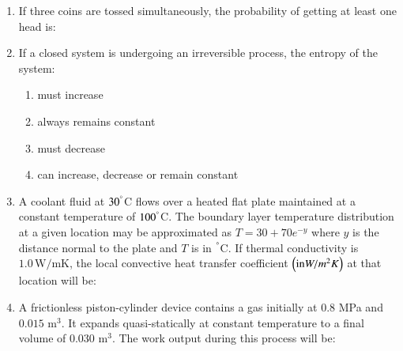 \documentclass[journal]{IEEEtran}
\begin{document}
\begin{enumerate}[leftmargin=0pt]
\item If three coins are tossed simultaneously, the probability of getting at least one head is:
  \begin{enumerate}
  \end{enumerate}
  \hfill{}


\item If a closed system is undergoing an irreversible process, the entropy of the system:
  \begin{enumerate}
    \item must increase
    \item always remains constant
    \item must decrease
    \item can increase, decrease or remain constant
  \end{enumerate}
  \hfill{}

\item A coolant fluid at $30^\degree$C flows over a heated flat plate maintained at a constant temperature of $100^\degree$C. The boundary layer temperature distribution at a given location may be approximated as $T = 30 + 70 e^{-y}$ where $y$  is the distance normal to the plate and $T$ is in $^\degree$C. If thermal conductivity is $1.0\,\mathrm{W/mK}$, the local convective heat transfer coefficient $\left(\text{in} W/m^2K\right)$ at that location will be:
  \begin{enumerate}
  \end{enumerate}
  \hfill{}

\item A frictionless piston-cylinder device contains a gas initially at $0.8$ MPa and $0.015$ m$^3$. It expands quasi-statically at constant temperature to a final volume of $0.030$ m$^3$. The work output  during this process will be:
  \begin{enumerate}
  \end{enumerate}
  \hfill{}


\end{enumerate}
\end{document}

